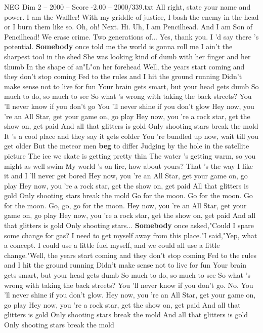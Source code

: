 \begin{textsample}{NEG Dim 2 – 2000 – Score -2.00 – 2000/339.txt}  \label{ex:f2_neg_034}
All right, state your name and power.
I am the Waffler!
With my griddle of justice, I bash the enemy in the head or I burn them like so.
Oh, oh!
Next.
Hi.
Uh, I am Pencilhead.
And I am Son of Pencilhead!
We erase crime.
Two generations of...
Yes, thank you.
I 'd say there 's potential. \textbf{Somebody} once told me the world is gonna roll me I ain't the sharpest tool in the shed She was looking kind of dumb with her finger and her thumb In the shape of an"L"on her forehead Well, the years start coming and they don't stop coming Fed to the rules and I hit the ground running Didn't make sense not to live for fun Your brain gets smart, but your head gets dumb So much to do, so much to see So what 's wrong with taking the back streets?
You 'll never know if you don't go You 'll never shine if you don't glow Hey now, you 're an All Star, get your game on, go play Hey now, you 're a rock star, get the show on, get paid And all that glitters is gold Only shooting stars break the mold It 's a cool place and they say it gets colder You 're bundled up now, wait till you get older But the meteor men \textbf{beg} to differ Judging by the hole in the satellite picture The ice we skate is getting pretty thin The water 's getting warm, so you might as well swim My world 's on fire, how about yours?
That 's the way I like it and I 'll never get bored Hey now, you 're an All Star, get your game on, go play Hey now, you 're a rock star, get the show on, get paid All that glitters is gold Only shooting stars break the mold Go for the moon.
Go for the moon.
Go for the moon.
Go, go, go for the moon.
Hey now, you 're an All Star, get your game on, go play Hey now, you 're a rock star, get the show on, get paid And all that glitters is gold Only shooting stars... \textbf{Somebody} once asked,"Could I spare some change for gas?
I need to get myself away from this place."I said,"Yep, what a concept.
I could use a little fuel myself, and we could all use a little change."Well, the years start coming and they don't stop coming Fed to the rules and I hit the ground running Didn't make sense not to live for fun Your brain gets smart, but your head gets dumb So much to do, so much to see So what 's wrong with taking the back streets?
You 'll never know if you don't go.
No.
You 'll never shine if you don't glow.
Hey now, you 're an All Star, get your game on, go play Hey now, you 're a rock star, get the show on, get paid And all that glitters is gold Only shooting stars break the mold And all that glitters is gold Only shooting stars break the mold

\end{textsample}
